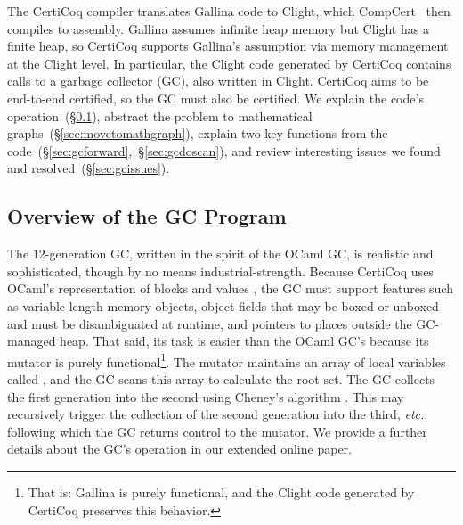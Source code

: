 


The CertiCoq compiler \cite{certicoqpaper} translates Gallina code to
Clight, which CompCert~\cite{leroy:compcert} then compiles to assembly.
Gallina assumes infinite heap memory but Clight has a 
finite heap, so
CertiCoq supports Gallina's assumption via 
memory management at the Clight level.
In particular, the Clight code generated by CertiCoq contains 
calls to a garbage collector (GC), also written in Clight. 
CertiCoq aims to be end-to-end certified, so the GC must also be certified.
We explain the code's operation~(\S\ref{sec:gcbackground}), 
abstract the problem to mathematical graphs~(\S\ref{sec:movetomathgraph}),
explain two key functions from the code~(\S\ref{sec:gcforward},~\S\ref{sec:gcdoscan}),
and review interesting issues we found and resolved~(\S\ref{sec:gcissues}).

\subsection{Overview of the GC Program}
\label{sec:gcbackground}

The $12$-generation GC, written in the spirit of the OCaml GC,
is realistic and sophisticated, though by no means
industrial-strength.
Because CertiCoq uses OCaml's representation of blocks and
values \cite{realworldocaml}, the GC must support features such as
variable-length memory objects, object fields that may be boxed
or unboxed and must be disambiguated at runtime, and pointers to places
outside the GC-managed heap.
That said, its task is easier than the OCaml GC's because
its mutator is purely functional\footnote{That is: Gallina is purely functional, and
the Clight code generated by CertiCoq preserves this behavior.}.
The mutator maintains an array of
local variables called , and the GC scans this array to
calculate the root set. The GC collects the first generation
into the second using Cheney's algorithm \cite{cheney:gc}.
This may recursively trigger the collection of the second generation
into the third, \emph{etc.}, following which the GC returns control to the mutator. 
We provide a further details about the GC's operation in 
our extended online paper.

